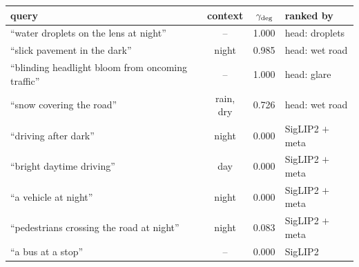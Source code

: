 \setlength{\tabcolsep}{3pt}
\begin{tabular}{@{}lccl@{}}
\toprule
query & context & $\gamma_{\mathrm{deg}}$ & ranked by\\
\midrule
``water droplets on the lens at night'' & -- & 1.000 & head: droplets\\
``slick pavement in the dark'' & night & 0.985 & head: wet road\\
``blinding headlight bloom from oncoming traffic'' & -- & 1.000 & head: glare\\
``snow covering the road'' & rain, dry & 0.726 & head: wet road\\
``driving after dark'' & night & 0.000 & SigLIP2 $+$ meta\\
``bright daytime driving'' & day & 0.000 & SigLIP2 $+$ meta\\
``a vehicle at night'' & night & 0.000 & SigLIP2 $+$ meta\\
``pedestrians crossing the road at night'' & night & 0.083 & SigLIP2 $+$ meta\\
``a bus at a stop'' & -- & 0.000 & SigLIP2\\
\bottomrule
\end{tabular}
